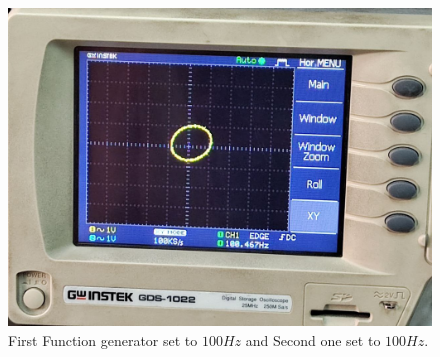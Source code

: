 \documentclass[11pt]{article}
\begin{document}
\begin{question}
{\begin{figure}[H]
\begin{center}
                \includegraphics[scale=0.1]{Fig/61.jpeg}
                \caption{First Function generator set to $100Hz$ and Second one set to $100Hz$.}
            \end{center}
        \end{figure}

}
\end{question}
\end{document}
